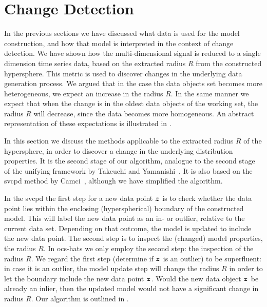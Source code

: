 \section{Change Detection}\label{sec:method_change_detection}
In the previous sections we have discussed what data is used for the model construction, and how that model is interpreted in the context of change detection.
We have shown how the multi-dimensional signal is reduced to a single dimension time series data, based on the extracted radius $R$ from the constructed hypersphere.
This metric is used to discover changes in the underlying data generation process.
We argued that in the case the data objects set becomes more heterogeneous, we expect an increase in the radius $R$.
In the same manner we expect that when the change is in the oldest data objects of the working set, the radius $R$ will decrease, since the data becomes more homogeneous.
An abstract representation of these expectations is illustrated in .

In this section we discuss the methods applicable to the extracted radius $R$ of the hypersphere, in order to discover a change in the underlying distribution properties.
It is the second stage of our algorithm, analogue to the second stage of the unifying framework by Takeuchi and Yamanishi~\cite{takeuchi2006unifying}.
It is also based on the \gls{svcpd} method by Camci~\cite{camci2010change}, although we have simplified the algorithm.

In the \gls{svcpd} the first step for a new data point $\vectorsym{z}$ is to check whether the data point lies within the enclosing (hyperspherical) boundary of the constructed model.
This will label the new data point as an in- or outlier, relative to the current data set.
Depending on that outcome, the model is updated to include the new data point.
The second step is to inspect the (changed) model properties, \ie the radius $R$.
In \gls{ocs-hats} we only employ the second step: the inspection of the radius $R$.
We regard the first step (determine if $\vectorsym{z}$ is an outlier) to be superfluent: in case it is an outlier, the model update step will change the radius $R$ in order to let the boundary include the new data point $\vectorsym{z}$.
Would the new data object $\vectorsym{z}$ be already an inlier, then the updated model would not have a significant change in radius $R$.
Our algorithm is outlined in .

